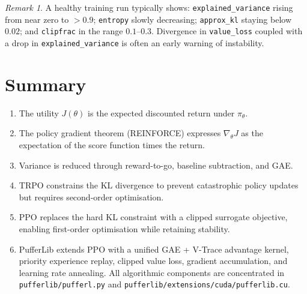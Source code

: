 \documentclass[12pt, a4paper]{article}
\theoremstyle{definition}
\theoremstyle{plain}
\theoremstyle{remark}
\newtheorem{remark}{Remark}[section]
\begin{document}
\begin{remark}
  A healthy training run typically shows: \texttt{explained\_variance} rising from near
  zero to $> 0.9$; \texttt{entropy} slowly decreasing; \texttt{approx\_kl} staying
  below $0.02$; and \texttt{clipfrac} in the range $0.1$--$0.3$.  Divergence in
  \texttt{value\_loss} coupled with a drop in \texttt{explained\_variance} is often an
  early warning of instability.
\end{remark}

\section{Summary}
\label{sec:summary}

\begin{enumerate}
  \item The utility $J(\theta)$ is the expected discounted return under $\pi_\theta$.
  \item The policy gradient theorem (REINFORCE) expresses $\nabla_\theta J$ as the
        expectation of the score function times the return.
  \item Variance is reduced through reward-to-go, baseline subtraction, and GAE.
  \item TRPO constrains the KL divergence to prevent catastrophic policy updates but
        requires second-order optimisation.
  \item PPO replaces the hard KL constraint with a clipped surrogate objective,
        enabling first-order optimisation while retaining stability.
  \item PufferLib extends PPO with a unified GAE + V-Trace advantage kernel, priority
        experience replay, clipped value loss, gradient accumulation, and learning rate
        annealing.  All algorithmic components are concentrated in
        \texttt{pufferlib/pufferl.py} and
        \texttt{pufferlib/extensions/cuda/pufferlib.cu}.
\end{enumerate}

\end{document}
